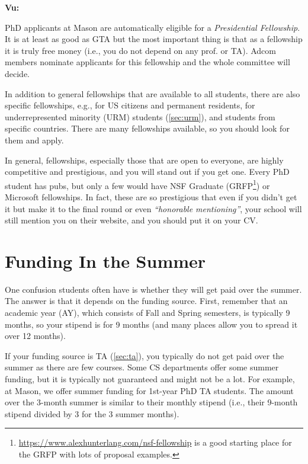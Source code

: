 \documentclass[oneside,11pt,dvipsnames]{book}
\newenvironment{commentbox}[1][]{
  \small
  \begin{mybox}
    {\small \textbf{#1}}
  }{
  \end{mybox}
}
\begin{document}
\begin{commentbox}[Vu:]
  PhD applicants at Mason are automatically eligible for a \emph{Presidential Fellowship}.  It is at least as good as GTA but the most important thing is that as a fellowship it is truly free money (i.e., you do not depend on any prof. or TA).  Adcom members nominate applicants for this fellowship and the whole committee will decide.
\end{commentbox}

In addition to general fellowships that are available to all students, there are also specific fellowships, e.g., for US citizens and permanent residents, for underrepresented minority (URM) students (\autoref{sec:urm}), and students from specific countries. There are many fellowships available, so you should look for them and apply.

In general, fellowships, especially those that are open to everyone, are highly competitive and prestigious, and you will stand out if you get one.  Every PhD student has pubs, but only a few would have NSF Graduate (GRFP\footnote{\url{https://www.alexhunterlang.com/nsf-fellowship} is a good starting place for the GRFP with lots of proposal examples.}) or Microsoft fellowships. In fact, these are so prestigious that even if you didn't get it but make it to the final round or even \emph{``honorable mentioning''}, your school will still mention you on their website, and you should put it on your CV.


\section{Funding In the Summer}\label{sec:summer-funding}

One confusion students often have is whether they will get paid over the summer.  The answer is that it depends on the funding source.
First, remember that an academic year (AY), which consists of Fall and Spring semesters, is typically 9 months, so your stipend is for 9 months (and many places allow you to spread it over 12 months).

If your funding source is TA (\autoref{sec:ta}), you typically do not get paid over the summer as there are few courses.
Some CS departments offer some summer funding, but it is typically not guaranteed and might not be a lot. For example, at Mason, we offer summer funding for 1st-year PhD TA students. The amount over the 3-month summer is similar to their monthly stipend (i.e., their 9-month stipend divided by 3 for the 3 summer months).
\end{document}
